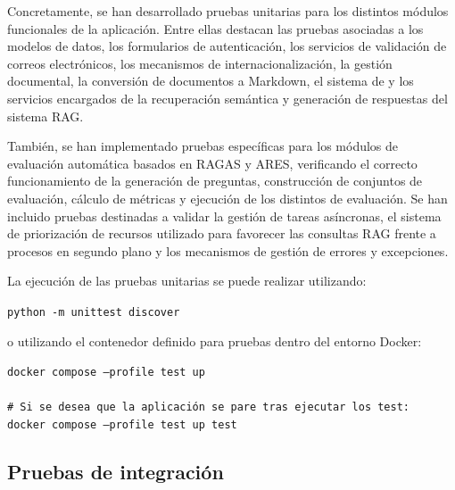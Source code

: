 Concretamente, se han desarrollado pruebas unitarias para los distintos módulos funcionales de la aplicación. Entre ellas destacan las pruebas asociadas a los modelos de datos, los formularios de autenticación, los servicios de validación de correos electrónicos, los mecanismos de internacionalización, la gestión documental, la conversión de documentos a Markdown, el sistema de  y los servicios encargados de la recuperación semántica y generación de respuestas del sistema RAG.

También, se han implementado pruebas específicas para los módulos de evaluación automática basados en RAGAS y ARES, verificando el correcto funcionamiento de la generación de preguntas, construcción de conjuntos de evaluación, cálculo de métricas y ejecución de los distintos  de evaluación. Se han incluido pruebas destinadas a validar la gestión de tareas asíncronas, el sistema de priorización de recursos utilizado para favorecer las consultas RAG frente a procesos en segundo plano y los mecanismos de gestión de errores y excepciones.

La ejecución de las pruebas unitarias se puede realizar utilizando:

\begin{tcolorbox}[
	colback=black!3,
	colframe=black!30,
	boxrule=0.5pt,
	arc=2mm,
	title= Terminal - Ejecución de pruebas unitarias,
	fonttitle=\bfseries,
	breakable 
]
	{\footnotesize
		\noindent
		\texttt{python -m unittest discover}
	}
\end{tcolorbox}

o utilizando el contenedor definido para pruebas dentro del entorno Docker:

\begin{tcolorbox}[
	colback=black!3,
	colframe=black!30,
	boxrule=0.5pt,
	arc=2mm,
	title= Terminal - Ejecución de pruebas mediante Docker,
	fonttitle=\bfseries,
	breakable 
]
	{\footnotesize
		\noindent
		\texttt{docker compose --profile test up}\\
		\\
		\texttt{\# Si se desea que la aplicación se pare tras ejecutar los test:}\\
		\texttt{docker compose --profile test up test}
	}
\end{tcolorbox}

\subsection{Pruebas de integración}

